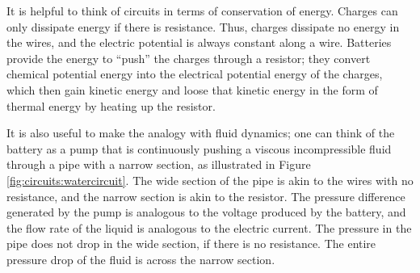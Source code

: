 It is helpful to think of circuits in terms of conservation of energy. Charges can only dissipate energy if there is resistance. Thus, charges dissipate no energy in the wires, and the electric potential is always constant along a wire. Batteries provide the energy to ``push'' the charges through a resistor; they convert chemical potential energy into the electrical potential energy of the charges, which then gain kinetic energy and loose that kinetic energy in the form of thermal energy by heating up the resistor.

It is also useful to make the analogy with fluid dynamics; one can think of the battery as a pump that is continuously pushing a viscous incompressible fluid through a pipe with a narrow section, as illustrated in Figure \ref{fig:circuits:watercircuit}. The wide section of the pipe is akin to the wires with no resistance, and the narrow section is akin to the resistor. The pressure difference generated by the pump is analogous to the voltage produced by the battery, and the flow rate of the liquid is analogous to the electric current. The pressure in the pipe does not drop in the wide section, if there is no resistance. The entire pressure drop of the fluid is across the narrow section.
